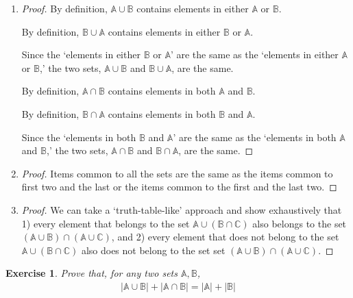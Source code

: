 \documentclass[11pt]{book}
\theoremstyle{definition}
\theoremstyle{plain}
\newtheorem{exercise}{Exercise}
\theoremstyle{definition}
\theoremstyle{problemstyle}
\theoremstyle{remark}
\theoremstyle{definition}
\begin{document}
    \begin{enumerate}[label={(\alph*)}]
        \item 
            \begin{proof}

            By definition, $\mathbb{A}\cup\mathbb{B}$ contains elements in either $\mathbb{A}$ or $\mathbb{B}$.

            By definition, $\mathbb{B}\cup\mathbb{A}$ contains elements in either $\mathbb{B}$ or $\mathbb{A}$.

            Since the `elements in either $\mathbb{B}$ or $\mathbb{A}$' are the same as the `elements in either $\mathbb{A}$ or $\mathbb{B}$,' the two sets, $\mathbb{A}\cup\mathbb{B}$ and $\mathbb{B}\cup\mathbb{A}$, are the same.

            By definition, $\mathbb{A}\cap\mathbb{B}$ contains elements in both $\mathbb{A}$ and $\mathbb{B}$.

            By definition, $\mathbb{B}\cap\mathbb{A}$ contains elements in both $\mathbb{B}$ and $\mathbb{A}$.

            Since the `elements in both $\mathbb{B}$ and $\mathbb{A}$' are the same as the `elements in both $\mathbb{A}$ and $\mathbb{B}$,' the two sets, $\mathbb{A}\cap\mathbb{B}$ and $\mathbb{B}\cap\mathbb{A}$, are the same.
            \end{proof}
        \item
            \begin{proof}
                Items common to all the sets are the same as the items common to first two and the last or the items common to the first and the last two.
            \end{proof}
        \item
            \begin{proof}
                We can take a `truth-table-like' approach and show exhaustively that 1) every element that belongs to the set $\mathbb{A}\cup(\mathbb{B}\cap\mathbb{C})$ also belongs to the set $(\mathbb{A}\cup\mathbb{B})\cap(\mathbb{A}\cup\mathbb{C})$, and 2) every element that does not belong to the set $\mathbb{A}\cup(\mathbb{B}\cap\mathbb{C})$ also does not belong to the set set $(\mathbb{A}\cup\mathbb{B})\cap(\mathbb{A}\cup\mathbb{C})$.
            \end{proof}
    \end{enumerate}
\begin{exercise}
    Prove that, for any two sets $\mathbb{A},\mathbb{B}$, 
    \begin{align}
        \lvert\mathbb{A}\cup\mathbb{B}\rvert+\lvert\mathbb{A}\cap\mathbb{B}\rvert=\lvert\mathbb{A}\rvert+\lvert\mathbb{B}\rvert
    \end{align}
    \label{ex:1.2.17}
\end{exercise}
\end{document}
